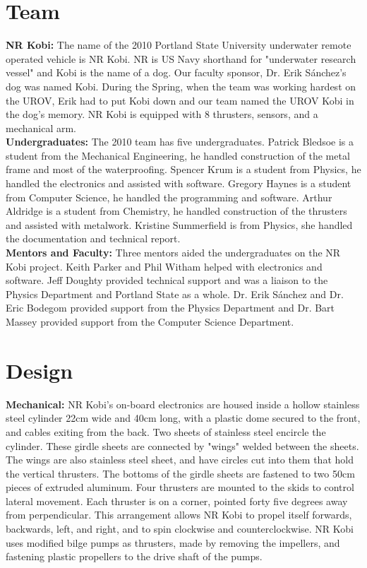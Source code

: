 \documentclass{article}
\begin{document}
\section{Team}
\noindent
{\bf NR Kobi:}
The name of the 2010 Portland State University underwater remote operated vehicle is NR Kobi. NR is US Navy shorthand for "underwater research vessel" and Kobi is the name of a dog. Our faculty sponsor, Dr. Erik S\'{a}nchez's dog was named Kobi. During the Spring, when the team was working hardest on the UROV, Erik had to put Kobi down and our team named the UROV Kobi in the dog's memory. NR Kobi is equipped with 8 thrusters, sensors, and a mechanical arm. 
\\

\noindent
{\bf Undergraduates:}
The 2010 team has five undergraduates. Patrick Bledsoe is a student from the Mechanical Engineering, he handled construction of the metal frame and most of the waterproofing. Spencer Krum is a student from Physics, he handled the electronics and assisted with software. Gregory Haynes is a student from Computer Science, he handled the programming and software. Arthur Aldridge is a student from Chemistry, he handled construction of the thrusters and assisted with metalwork. Kristine Summerfield is from Physics, she handled the documentation and technical report. 
\\

\noindent
{\bf Mentors and Faculty:}
Three mentors aided the undergraduates on the NR Kobi project. Keith Parker and Phil Witham helped with electronics and software. Jeff Doughty provided technical support and was a liaison to the Physics Department and Portland State as a whole. Dr. Erik S\'{a}nchez and Dr. Eric Bodegom provided support from the Physics Department and Dr. Bart Massey provided support from the Computer Science Department.

\section{Design}
\noindent
{\bf Mechanical:}
NR Kobi's on-board electronics are housed inside a hollow stainless steel
cylinder 22cm wide and 40cm long, with a plastic dome secured to the front,
and cables exiting from the back. Two sheets of stainless steel encircle
the cylinder. These girdle sheets are connected by "wings" welded between
the sheets. The wings are also stainless steel sheet, and have circles cut
into them that hold the vertical thrusters. The bottoms of the girdle
sheets are fastened to two 50cm pieces of extruded aluminum.
Four thrusters are mounted to the skids to control lateral movement.
Each thruster is on a corner, pointed forty five degrees away from
perpendicular.
This arrangement allows NR Kobi to propel itself forwards, backwards,
left, and right, and to spin clockwise and counterclockwise. NR Kobi
uses modified bilge pumps as thrusters, made by removing the impellers,
and fastening plastic propellers to the drive shaft of the pumps.
\\
\end{document}
